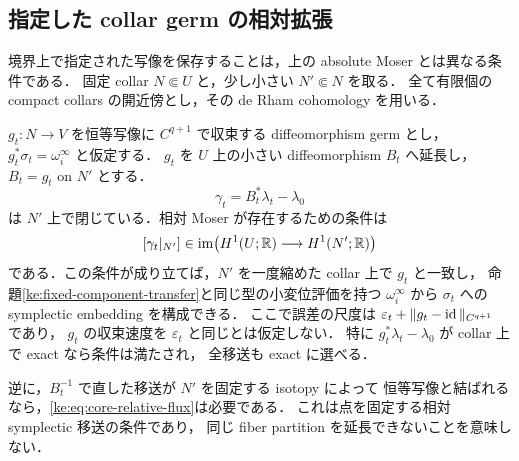 \subsection{指定した collar germ の相対拡張}

境界上で指定された写像を保存することは，上の absolute Moser とは異なる条件である．
固定 collar $N\Subset U$ と，少し小さい $N'\Subset N$ を取る．
全て有限個の compact collars の開近傍とし，その de Rham cohomology を用いる．

\begin{proposition}
\label{ke:component-relative-flux}
$g_t:N\to V$ を恒等写像に $C^{q+1}$ で収束する diffeomorphism germ とし，
$g_t^*\sigma_t=\omega_i^\infty$ と仮定する．
$g_t$ を $U$ 上の小さい diffeomorphism $B_t$ へ延長し，
$B_t=g_t$ on $N'$ とする．
\[
 \gamma_t=B_t^*\lambda_t-\lambda_0
\]
は $N'$ 上で閉じている．相対 Moser が存在するための条件は
\begin{equation}\label{ke:eq:core-relative-flux}
 [\gamma_t|_{N'}]\in
 \operatorname{im}\bigl(H^1(U;\mathbb R)\longrightarrow H^1(N';\mathbb R)\bigr)
\end{equation}
である．この条件が成り立てば，$N'$ を一度縮めた collar 上で $g_t$ と一致し，
命題\ref{ke:fixed-component-transfer}と同じ型の小変位評価を持つ
$\omega_i^\infty$ から $\sigma_t$ への symplectic embedding を構成できる．
ここで誤差の尺度は
$\varepsilon_t+\|g_t-\operatorname{id}\|_{C^{q+1}}$ であり，
$g_t$ の収束速度を $\varepsilon_t$ と同じとは仮定しない．
特に $g_t^*\lambda_t-\lambda_0$ が collar 上で exact なら条件は満たされ，
全移送も exact に選べる．

逆に，$B_t^{-1}$ で直した移送が $N'$ を固定する isotopy によって
恒等写像と結ばれるなら，\eqref{ke:eq:core-relative-flux}は必要である．
これは点を固定する相対 symplectic 移送の条件であり，
同じ fiber partition を延長できないことを意味しない．
\end{proposition}

